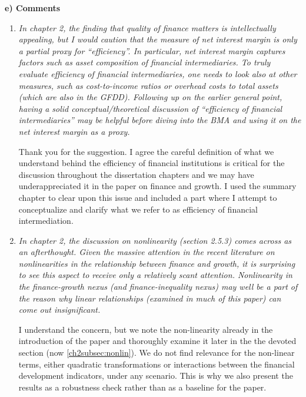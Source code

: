 \textbf{e) Comments}
\begin{enumerate}
    \item \textit{In chapter 2, the finding that quality of finance matters is intellectually appealing, but I would caution that the measure of net interest margin is only a partial proxy for ``efficiency''. In particular, net interest margin captures factors such as asset composition of financial intermediaries. To truly evaluate efficiency of financial intermediaries, one needs to look also at other measures, such as cost-to-income ratios or overhead costs to total assets (which are also in the GFDD). Following up on the earlier general point, having a solid conceptual/theoretical discussion of ``efficiency of financial intermediaries'' may be helpful before diving into the BMA and using it on the net interest margin as a proxy.}
    
    Thank you for the suggestion. I agree the careful definition of what we understand behind the efficiency of financial institutions is critical for the discussion throughout the dissertation chapters and we may have underappreciated it in the paper on finance and growth. I used the summary chapter to clear upon this issue and included a part where I attempt to conceptualize and clarify what we refer to as efficiency of financial intermediation.
    
    \item \textit{In chapter 2, the discussion on nonlinearity (section 2.5.3) comes across as an afterthought. Given the massive attention in the recent literature on nonlinearities in the relationship between finance and growth, it is surprising to see this aspect to receive only a relatively scant attention. Nonlinearity in the finance-growth nexus (and finance-inequality nexus) may well be a part of the reason why linear relationships (examined in much of this paper) can come out insignificant.}
    
    I understand the concern, but we note the non-linearity already in the introduction of the paper and thoroughly examine it later in the the devoted section (now \ref{ch2subsec:nonlin}). We do not find relevance for the non-linear terms, either quadratic transformations or interactions between the financial development indicators, under any scenario. This is why we also present the results as a robustness check rather than as a baseline for the paper.


\end{enumerate}
